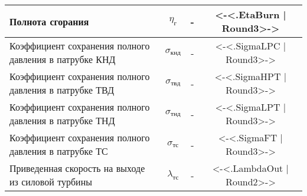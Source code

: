 \begin{center}
\begin{longtable}{|p{7cm}|c|c|c|}
		Полнота сгорания & $\eta_{г}$ & - & <-<.EtaBurn | Round3>-> \\ \hline
		Коэффициент сохранения полного давления в патрубке КНД & $\sigma_{кнд}$ & - & <-<.SigmaLPC | Round3>-> \\ \hline
		Коэффициент сохранения полного давления в патрубке ТВД & $\sigma_{твд}$ & - & <-<.SigmaHPT | Round3>-> \\ \hline
		Коэффициент сохранения полного давления в патрубке ТНД & $\sigma_{тнд}$ & - & <-<.SigmaLPT | Round3>-> \\ \hline
		Коэффициент сохранения полного давления в патрубке ТС & $\sigma_{тс}$ & - & <-<.SigmaFT | Round3>-> \\ \hline
		Приведенная скорость на выходе из силовой турбины & $\lambda_{тс}$ & - & <-<.LambdaOut | Round2>-> \\ \hline
	\end{longtable}
\end{center}
\clearpage

%